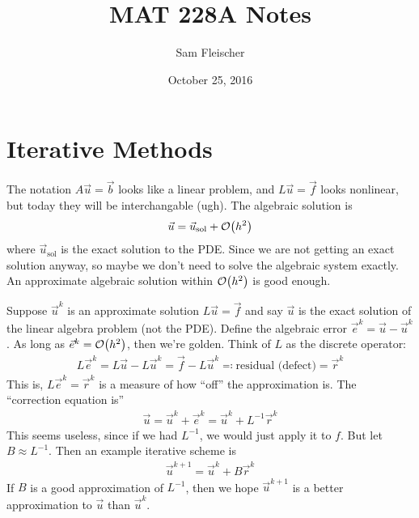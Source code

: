 \documentclass{article}
\title{MAT 228A Notes}
\author{Sam Fleischer}
\date{October 25, 2016}
\begin{document}
    \maketitle

    \section{Iterative Methods}
        The notation $A\vec{u} = \vec{b}$ looks like a linear problem, and $L\vec{u} = \vec{f}$ looks nonlinear, but today they will be interchangable (ugh).  The algebraic solution is
        \begin{align*}
            \vec{u} = \vec{u}_\text{sol} + \order{h^2}
        \end{align*}
        where $\vec{u}_\text{sol}$ is the exact solution to the PDE.  Since we are not getting an exact solution anyway, so maybe we don't need to solve the algebraic system exactly.  An approximate algebraic solution within $\order{h^2}$ is good enough.

        Suppose $\vec{u}^k$ is an approximate solution $L\vec{u} = \vec{f}$ and say $\vec{u}$ is the exact solution of the linear algebra problem (not the PDE).  Define the algebraic error $\vec{e}^k = \vec{u} - \vec{u}^k$.  As long as $\vec{e}^k = \order{h^2}$, then we're golden.  Think of $L$ as the discrete operator:
        \begin{align*}
            L\vec{e}^k = L\vec{u} - L\vec{u}^k = \vec{f} - L\vec{u}^k \eqqcolon \text{residual (defect)} = \vec{r}^k
        \end{align*}
        This is, $L\vec{e}^k = \vec{r}^k$ is a measure of how ``off'' the approximation is.  The ``correction equation is''
        \begin{align*}
            \vec{u} = \vec{u}^k + \vec{e}^k = \vec{u}^k + L^{-1}\vec{r}^k
        \end{align*}
        This seems useless, since if we had $L^{-1}$, we would just apply it to $f$.  But let $B \approx L^{-1}$.  Then an example iterative scheme is 
        \begin{align*}
            \vec{u}^{k+1} = \vec{u}^k + B\vec{r}^k
        \end{align*}
        If $B$ is a good approximation of $L^{-1}$, then we hope $\vec{u}^{k+1}$ is a better approximation to $\vec{u}$ than $\vec{u}^k$.
        
\end{document}
